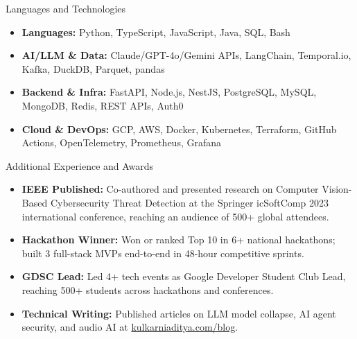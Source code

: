 \documentclass[]{mcdowellcv}
\begin{document}
\begin{cvsection}{Languages and Technologies}
  \begin{cvsubsection}{}{}{}
    \begin{itemize}
      \item \textbf{Languages:} Python, TypeScript, JavaScript, Java, SQL, Bash
      \item \textbf{AI/LLM \& Data:} Claude/GPT-4o/Gemini APIs, LangChain, Temporal.io, Kafka, DuckDB, Parquet, pandas
      \item \textbf{Backend \& Infra:} FastAPI, Node.js, NestJS, PostgreSQL, MySQL, MongoDB, Redis, REST APIs, Auth0
      \item \textbf{Cloud \& DevOps:} GCP, AWS, Docker, Kubernetes, Terraform, GitHub Actions, OpenTelemetry, Prometheus, Grafana
    \end{itemize}
  \end{cvsubsection}
\end{cvsection}

\begin{cvsection}{Additional Experience and Awards}
  \begin{cvsubsection}{}{}{}
    \begin{itemize}
      \item \textbf{IEEE Published:} Co-authored and presented research on Computer Vision-Based Cybersecurity Threat Detection at the Springer icSoftComp 2023 international conference, reaching an audience of 500+ global attendees.
      \item \textbf{Hackathon Winner:} Won or ranked Top 10 in 6+ national hackathons; built 3 full-stack MVPs end-to-end in 48-hour competitive sprints.
      \item \textbf{GDSC Lead:} Led 4+ tech events as Google Developer Student Club Lead, reaching 500+ students across hackathons and conferences.
      \item \textbf{Technical Writing:} Published articles on LLM model collapse, AI agent security, and audio AI at \href{https://www.kulkarniaditya.com/blog}{kulkarniaditya.com/blog}.
    \end{itemize}
  \end{cvsubsection}
\end{cvsection}
\end{document}
